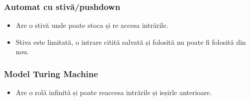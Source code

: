 \begin{frame}
    \frametitle{Automat cu stivă/pushdown}
    \newsavebox{\asciistackfsm}
    \begin{lrbox}{\asciistackfsm}
        \begin{varwidth}{\maxdimen}
        \end{varwidth}
    \end{lrbox}%

    \begin{figure}[h]
        \centering
        \scalebox{0.8}{\usebox{\asciistackfsm}}
    \end{figure}
    \begin{itemize}
        \item Are o stivă unde poate stoca și re accesa intrările.
        \item Stiva este limitată, o intrare citită salvată și folosită nu poate fi folosită din nou.
    \end{itemize}
\end{frame}


\begin{frame}
    \frametitle{Model Turing Machine}
    \newsavebox{\asciituring}
    \begin{lrbox}{\asciituring}
        \begin{varwidth}{\maxdimen}
        \end{varwidth}
    \end{lrbox}%

    \begin{figure}[h]
        \centering
        \scalebox{0.8}{\usebox{\asciituring}}
    \end{figure}
    \begin{itemize}
        \item Are o rolă infinită și poate reaccesa intrările și ieșirle anterioare.
    \end{itemize}
\end{frame}